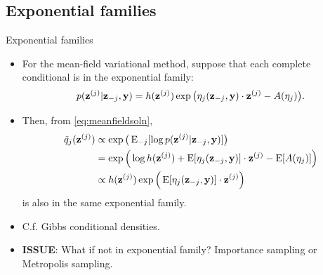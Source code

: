 \subsection{Exponential families}

\begin{frame}{Exponential families}
  \begin{itemize}[<+->]
    \item For the mean-field variational method, suppose that each complete conditional is in the exponential family:
    \[
      p({\mathbf z}^{(j)}|{\mathbf z}_{-j},{\mathbf y}) = h({\mathbf z}^{(j)})\exp \big(\eta_j({\mathbf z}_{-j},{\mathbf y})\cdot {\mathbf z}^{(j)} - A(\eta_j) \big).
    \]
    \item Then, from \eqref{eq:meanfieldsoln}, 
    \begin{align*}
      \tilde q_j({\mathbf z}^{(j)}) &\propto \exp\big(\operatorname{E}_{-j}[\log p({\mathbf z}^{(j)}|{\mathbf z}_{-j},{\mathbf y})]\big) \\
      &= \exp \Big(\log h({\mathbf z}^{(j)}) + \operatorname{E} [\eta_j({\mathbf z}_{-j},{\mathbf y})] \cdot {\mathbf z}^{(j)} - \operatorname{E} [ A(\eta_j) ] \Big) \\
      &\propto h({\mathbf z}^{(j)})\exp \Big(\operatorname{E} [\eta_j({\mathbf z}_{-j},{\mathbf y})] \cdot {\mathbf z}^{(j)} \Big)
    \end{align*}
    is also in the same exponential family.
    \item C.f. Gibbs conditional densities.
    \item \textbf{ISSUE}: What if not in exponential family?  Importance sampling or Metropolis sampling.
  \end{itemize}
\end{frame}

